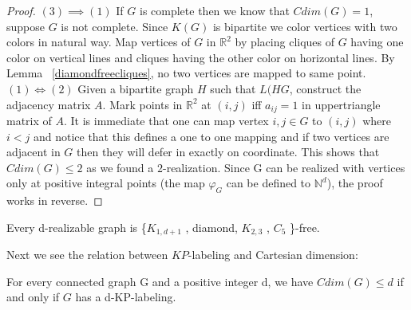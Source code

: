 \documentclass[12pt,a4paper,titlepage,openany]{report}
\begin{document}
\begin{proof}
$(3)\implies (1)$ If $G$ is complete then we know that $Cdim(G)=1$, suppose $G$ is not complete. Since $K(G)$ is bipartite we color vertices with two colors in natural way. Map vertices of $G$ in $\mathbb{R}^2$ by placing cliques of $G$ having one color on vertical lines and cliques having the other color on horizontal lines. By Lemma ~\ref{diamondfreecliques}, no two vertices are mapped to same point.
\newline
$(1)\iff (2)$ Given a bipartite graph $H$ such that $L(HG$, construct the adjacency matrix $A$. Mark points in $\mathbb{R}^2$ at $(i, j)$ iff $a_{ij} = 1$ in uppertriangle matrix of $A$. It is immediate that one can map vertex ${i,j}\in G$ to $(i,j)$ where $i<j$ and notice that this defines a one to one mapping and if two vertices are adjacent in $G$ then they will defer in exactly on coordinate. This shows that $Cdim(G)\leq 2$ as we found a $2$-realization.\newline
Since G can be realized with vertices only at positive integral points (the map $\varphi_G$ can be defined to $\mathbb{N}^d$), the proof works in reverse.
\end{proof}

\begin{theorem}
Every d-realizable graph is \{$K_{1,d+1}$ , diamond,
$K_{2,3}$ , $C_5$ \}-free.
\end{theorem} 

Next we see the relation between $KP$-labeling and Cartesian dimension:
 \begin{theorem}
For every connected graph G and a positive integer d, we have $Cdim(G) \leq d$ if and only if $G$ has a d-KP-labeling.
\end{theorem}
\end{document}
